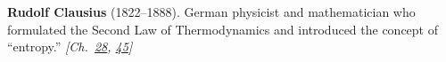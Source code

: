 \textbf{Rudolf Clausius} (1822–1888). German physicist and mathematician who formulated the Second Law of Thermodynamics and introduced the concept of ``entropy.'' \emph{[Ch.~\hyperref[ch:negativetemperature]{28}, \hyperref[ch:maxwelldemon]{45}]}

